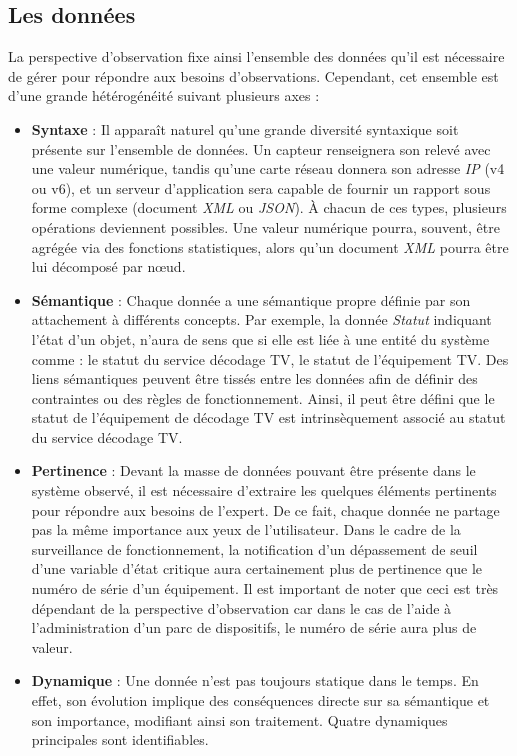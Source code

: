 \subsection{Les données}\label{sec:intro:problematique:data}
La perspective d'observation fixe ainsi l'ensemble des données qu'il est nécessaire de gérer pour répondre aux besoins d'observations. Cependant, cet ensemble est d'une grande hétérogénéité suivant plusieurs axes :
\begin{itemize}
 \item \textbf{Syntaxe} : Il apparaît naturel qu'une grande diversité syntaxique soit présente sur l'ensemble de données. Un capteur renseignera son relevé avec une valeur numérique, tandis qu'une carte réseau donnera son adresse \textit{IP} (v4 ou v6), et un serveur d'application sera capable de fournir un rapport sous forme complexe (document \textit{XML} ou \textit{JSON}). À chacun de ces types, plusieurs opérations deviennent possibles. Une valeur numérique pourra, souvent, être agrégée via des fonctions statistiques, alors qu'un document \textit{XML} pourra être lui décomposé par nœud.
 \item \textbf{Sémantique} : Chaque donnée a une sémantique propre définie par son attachement à différents concepts. Par exemple, la donnée \textit{Statut} indiquant l'état d'un objet, n'aura de sens que si elle est liée à une entité du système comme : le statut du service décodage TV, le statut de l'équipement TV. Des liens sémantiques peuvent être tissés entre les données afin de définir des contraintes ou des règles de fonctionnement. Ainsi, il peut être défini que le statut de l'équipement de décodage TV est intrinsèquement associé au statut du service décodage TV. 
 \item \textbf{Pertinence} : Devant la masse de données pouvant être présente dans le système observé, il est nécessaire d'extraire les quelques éléments pertinents pour répondre aux besoins de l'expert. De ce fait, chaque donnée ne partage pas la même importance aux yeux de l'utilisateur. Dans le cadre de la surveillance de fonctionnement, la notification d'un dépassement de seuil d'une variable d'état critique aura certainement plus de pertinence que le numéro de série d'un équipement. Il est important de noter que ceci est très dépendant de la perspective d'observation car dans le cas de l'aide à l'administration d'un parc de dispositifs, le numéro de série aura plus de valeur.
 \item \textbf{Dynamique} : Une donnée n'est pas toujours statique dans le temps. En effet, son évolution implique des conséquences directe sur sa sémantique et son importance, modifiant ainsi son traitement. Quatre dynamiques principales sont identifiables.

\end{itemize}
